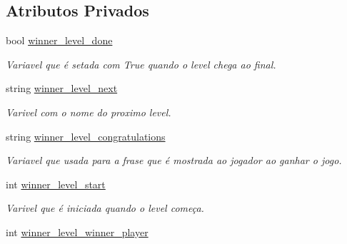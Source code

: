 \subsection*{Atributos Privados}
\begin{DoxyCompactItemize}
\item 
\mbox{\label{classWinnerLevel_ab80668cd7c7bfd279a71dd693b1ce7ff}} 
bool \mbox{\hyperlink{classWinnerLevel_ab80668cd7c7bfd279a71dd693b1ce7ff}{winner\+\_\+level\+\_\+done}}
\begin{DoxyCompactList}\small\item\em Variavel que é setada com True quando o level chega ao final. \end{DoxyCompactList}\item 
\mbox{\label{classWinnerLevel_a02fe4d829b5bf04ba9759a43930ec3e0}} 
string \mbox{\hyperlink{classWinnerLevel_a02fe4d829b5bf04ba9759a43930ec3e0}{winner\+\_\+level\+\_\+next}}
\begin{DoxyCompactList}\small\item\em Varivel com o nome do proximo level. \end{DoxyCompactList}\item 
\mbox{\label{classWinnerLevel_a1efac0902d25b1988498e594b64aba80}} 
string \mbox{\hyperlink{classWinnerLevel_a1efac0902d25b1988498e594b64aba80}{winner\+\_\+level\+\_\+congratulations}}
\begin{DoxyCompactList}\small\item\em Variavel que usada para a frase que é mostrada ao jogador ao ganhar o jogo. \end{DoxyCompactList}\item 
\mbox{\label{classWinnerLevel_a7aaaf28d27b0f09fca07ccbdc9ee2a57}} 
int \mbox{\hyperlink{classWinnerLevel_a7aaaf28d27b0f09fca07ccbdc9ee2a57}{winner\+\_\+level\+\_\+start}}
\begin{DoxyCompactList}\small\item\em Varivel que é iniciada quando o level começa. \end{DoxyCompactList}\item 
\mbox{\label{classWinnerLevel_ae85ff8c3635d50c24ab69884fc32a8f6}} 
int \mbox{\hyperlink{classWinnerLevel_ae85ff8c3635d50c24ab69884fc32a8f6}{winner\+\_\+level\+\_\+winner\+\_\+player}}

\end{DoxyCompactItemize}
